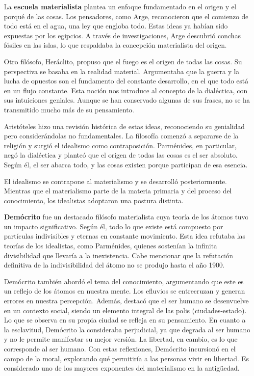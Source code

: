 \documentclass[
  jou,
  floatsintext,
  longtable,
  a4paper,
  nolmodern,
  notxfonts,
  notimes,
  12pt,
  colorlinks=true,linkcolor=blue,citecolor=blue,urlcolor=blue]{apa7}
\begin{document}
La \textbf{escuela materialista} plantea un enfoque fundamentado en el
origen y el porqué de las cosas. Los pensadores, como Arge, reconocieron
que el comienzo de todo está en el agua, una ley que engloba todo. Estas
ideas ya habían sido expuestas por los egipcios. A través de
investigaciones, Arge descubrió conchas fósiles en las islas, lo que
respaldaba la concepción materialista del origen.

Otro filósofo, Heráclito, propuso que el fuego es el origen de todas las
cosas. Su perspectiva se basaba en la realidad material. Argumentaba que
la guerra y la lucha de opuestos son el fundamento del constante
desarrollo, en el que todo está en un flujo constante. Esta noción nos
introduce al concepto de la dialéctica, con sus intuiciones geniales.
Aunque se han conservado algunas de sus frases, no se ha transmitido
mucho más de su pensamiento.

Aristóteles hizo una revisión histórica de estas ideas, reconociendo su
genialidad pero considerándolas no fundamentales. La filosofía comenzó a
separarse de la religión y surgió el idealismo como contraposición.
Parménides, en particular, negó la dialéctica y planteó que el origen de
todas las cosas es el ser absoluto. Según él, el ser abarca todo, y las
cosas existen porque participan de esa esencia.

El idealismo se contrapone al materialismo y se desarrolló
posteriormente. Mientras que el materialismo parte de la materia
primaria y del proceso del conocimiento, los idealistas adoptaron una
postura distinta.

\textbf{Demócrito} fue un destacado filósofo materialista cuya teoría de
los átomos tuvo un impacto significativo. Según él, todo lo que existe
está compuesto por partículas indivisibles y eternas en constante
movimiento. Esta idea refutaba las teorías de los idealistas, como
Parménides, quienes sostenían la infinita divisibilidad que llevaría a
la inexistencia. Cabe mencionar que la refutación definitiva de la
indivisibilidad del átomo no se produjo hasta el año 1900.

Demócrito también abordó el tema del conocimiento, argumentando que este
es un reflejo de los átomos en nuestra mente. Los efluvios se
entrecruzan y generan errores en nuestra percepción. Además, destacó que
el ser humano se desenvuelve en un contexto social, siendo un elemento
integral de las polis (ciudades-estado). Lo que se observa en su propia
ciudad se refleja en su pensamiento. En cuanto a la esclavitud,
Demócrito la consideraba perjudicial, ya que degrada al ser humano y no
le permite manifestar su mejor versión. La libertad, en cambio, es lo
que corresponde al ser humano. Con estas reflexiones, Demócrito
incursionó en el campo de la moral, explorando qué permitiría a las
personas vivir en libertad. Es considerado uno de los mayores exponentes
del materialismo en la antigüedad.
\end{document}
